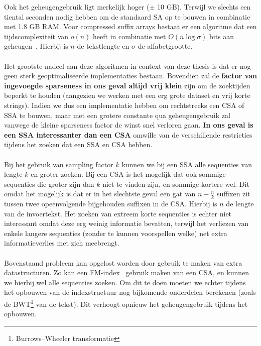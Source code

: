 Ook het geheugengebruik ligt merkelijk hoger ($\pm$ 10 GB).
Terwijl we slechts een tiental seconden nodig hebben om de standaard SA op te bouwen in combinatie met 1.8 GB RAM\@.
Voor compressed suffix arrays bestaat er een algoritme dat een tijdscomplexiteit van $o(n)$ heeft in combinatie met $O(n \log \sigma)$ bits aan geheugen~\cite{building_compressed_sa}.
Hierbij is $n$ de tekstlengte en $\sigma$ de alfabetgrootte.
\\ \\
Het grootste nadeel aan deze algoritmen in context van deze thesis is dat er nog geen sterk geoptimaliseerde implementaties bestaan.
Bovendien zal de \textbf{factor van ingevoegde sparseness in ons geval altijd vrij klein} zijn om de zoektijden beperkt te houden (aangezien we werken met een erg grote dataset en vrij korte strings).
Indien we dus een implementatie hebben om rechtstreeks een CSA of SSA te bouwen, maar met een grotere constante qua geheugengebruik zal vanwege de kleine sparseness factor de winst snel verloren gaan.
\textbf{In ons geval is een SSA interessanter dan een CSA} omwille van de verschillende restricties tijdens het zoeken dat een SSA en CSA hebben.
\\ \\
Bij het gebruik van sampling factor $k$ kunnen we bij een SSA alle sequenties van lengte $k$ en groter zoeken.
Bij een CSA is het mogelijk dat ook sommige sequenties die groter zijn dan $k$ niet te vinden zijn, en sommige kortere wel.
Dit omdat het mogelijk is dat er in het slechtste geval een gat van $n - \frac{n}{k}$ suffixen zit tussen twee opeenvolgende bijgehouden suffixen in de CSA\@.
Hierbij is $n$ de lengte van de invoertekst.
Het zoeken van extreem korte sequenties is echter niet interessant omdat deze erg weinig informatie bevatten, terwijl het verliezen van enkele langere sequenties (zonder te kunnen voorspellen welke) net extra informatieverlies met zich meebrengt.
\\ \\
Bovenstaand probleem kan opgelost worden door gebruik te maken van extra datastructuren.
Zo kan een FM-index~\cite{fm_index} gebruik maken van een CSA, en kunnen we hierbij wel alle sequenties zoeken.
Om dit te doen moeten we echter tijdens het opbouwen van de indexstructuur nog bijkomende onderdelen berekenen (zoals de BWT\footnote{Burrows–Wheeler transformatie} van de tekst).
Dit verhoogt opnieuw het geheugengebruik tijdens het opbouwen.

